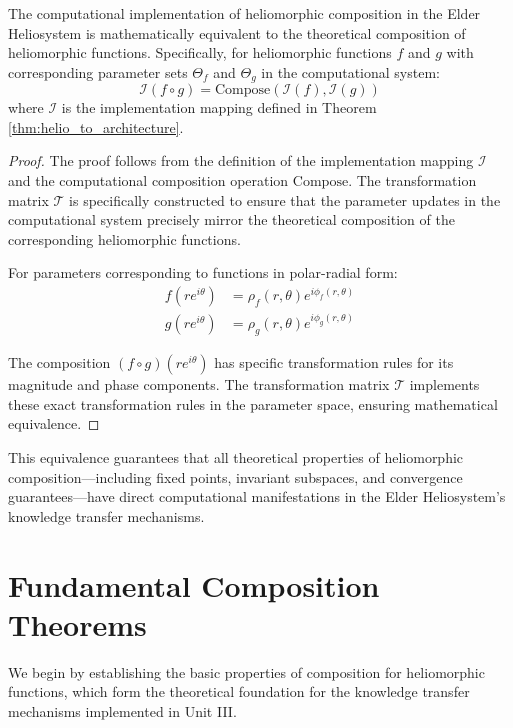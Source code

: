 \begin{theorem}
\label{thm:composition_equivalence}
The computational implementation of heliomorphic composition in the Elder Heliosystem is mathematically equivalent to the theoretical composition of heliomorphic functions. Specifically, for heliomorphic functions $f$ and $g$ with corresponding parameter sets $\Theta_f$ and $\Theta_g$ in the computational system:
\begin{equation}
\mathcal{I}(f \circ g) = \text{Compose}(\mathcal{I}(f), \mathcal{I}(g))
\end{equation}
where $\mathcal{I}$ is the implementation mapping defined in Theorem \ref{thm:helio_to_architecture}.
\end{theorem}

\begin{proof}
The proof follows from the definition of the implementation mapping $\mathcal{I}$ and the computational composition operation $\text{Compose}$. The transformation matrix $\mathcal{T}$ is specifically constructed to ensure that the parameter updates in the computational system precisely mirror the theoretical composition of the corresponding heliomorphic functions.

For parameters corresponding to functions in polar-radial form:
\begin{align}
f(re^{i\theta}) &= \rho_f(r,\theta)e^{i\phi_f(r,\theta)}\\
g(re^{i\theta}) &= \rho_g(r,\theta)e^{i\phi_g(r,\theta)}
\end{align}

The composition $(f \circ g)(re^{i\theta})$ has specific transformation rules for its magnitude and phase components. The transformation matrix $\mathcal{T}$ implements these exact transformation rules in the parameter space, ensuring mathematical equivalence.
\end{proof}

This equivalence guarantees that all theoretical properties of heliomorphic composition—including fixed points, invariant subspaces, and convergence guarantees—have direct computational manifestations in the Elder Heliosystem's knowledge transfer mechanisms.

\section{Fundamental Composition Theorems}

We begin by establishing the basic properties of composition for heliomorphic functions, which form the theoretical foundation for the knowledge transfer mechanisms implemented in Unit III.

